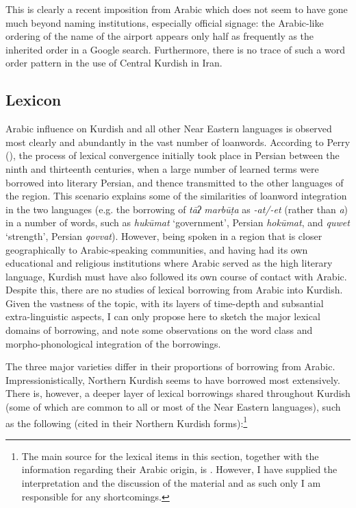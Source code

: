 \documentclass[output=paper]{langsci/langscibook}
\begin{document}

This is clearly a recent imposition from Arabic which does not seem to have gone much beyond naming institutions, especially official signage: the Arabic-like ordering of the name of the airport appears only half as frequently as the inherited order in a Google search. Furthermore, there is no trace of such a word order pattern in the use of Central Kurdish in Iran.  

\subsection{Lexicon}

Arabic influence on Kurdish and all other Near Eastern languages is observed most clearly and abundantly in the vast number of loanwords. According to Perry (\citeyear[97]{Perry2005}), the process of lexical convergence initially took place in Persian between the ninth and thirteenth centuries, when a large number of learned terms were borrowed into literary Persian, and thence transmitted to the other languages of the region. This scenario explains some of the similarities of loanword integration in the two languages (e.g. the borrowing of \textit{tāʔ} \textit{marbūṭa} as \textit{{}-at/-et} (rather than \textit{a}) in a number of words, such as \textit{hukūmat} ‘government’, Persian \textit{hokūmat}, and \textit{quwet} ‘strength’, Persian \textit{qovvat}). However, being spoken in a region that is closer geographically to Arabic-speaking communities, and having had its own educational and religious institutions where Arabic served as the high literary language, Kurdish must have also followed its own course of contact with Arabic. Despite this, there are no studies of lexical borrowing from Arabic into Kurdish. Given the vastness of the topic, with its layers of time-depth and subsantial extra-linguistic aspects, I can only propose here to sketch the major lexical domains of borrowing, and note some observations on the word class and morpho-phonological integration of the borrowings. 

The three major varieties differ in their proportions of borrowing from Arabic. Impressionistically, Northern Kurdish seems to have borrowed most extensively. There is, however, a deeper layer of lexical borrowings shared throughout Kurdish (some of which are common to all or most of the Near Eastern languages), such as the following (cited in their Northern Kurdish forms):\footnote{The main source for the lexical items in this section, together with the information regarding their Arabic origin, is \citet{Chyet2003}. However, I have supplied the interpretation and the discussion of the material and as such only I am responsible for any shortcomings.} 
\end{document}
